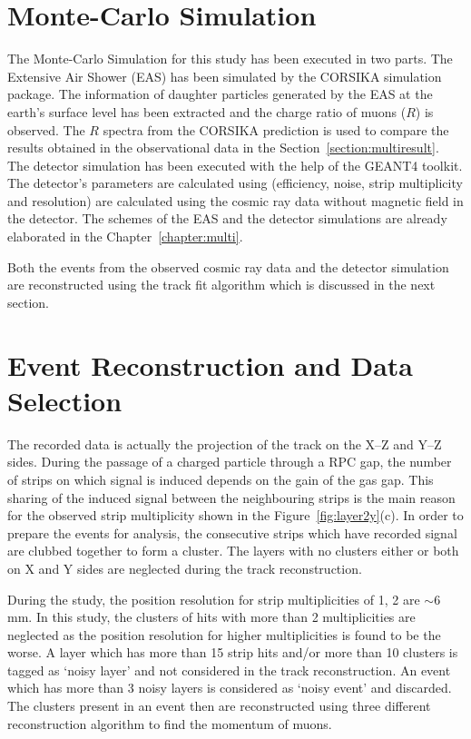 \section{Monte-Carlo Simulation}
The Monte-Carlo Simulation for this study has been executed in
two parts. The Extensive Air Shower (EAS) has been simulated
by the CORSIKA simulation package\cite{corsika763}. The information
of daughter particles generated by the EAS at the earth's surface
level has been extracted and the charge ratio of muons ($R$) is
observed. The $R$ spectra from the CORSIKA prediction is used to
compare the results obtained in the observational data in the
Section~\ref{section:multiresult}.
The detector simulation has been executed with the help
of the GEANT4 toolkit\cite{geant4}. The detector's parameters are
calculated using (efficiency, noise, strip multiplicity and
resolution) are calculated using the cosmic ray data without magnetic
field in the detector. The schemes of the EAS and the
detector simulations are already elaborated in the
Chapter~\ref{chapter:multi}.

Both the events from the observed cosmic ray data and the detector
simulation are reconstructed using the track fit algorithm which is
discussed in the next section.

\section{Event Reconstruction and Data Selection} \label{sec:momreco}
The recorded data is actually the projection of the track on the
\mbox{X--Z} and \mbox{Y--Z} sides. During the passage of a charged
particle through a RPC gap, the number of strips on which signal is
induced depends on the gain of the gas gap. This sharing of the induced
signal between the neighbouring strips is the main reason for the
observed strip multiplicity shown in the Figure~\ref{fig:layer2y}(c).
In order to prepare the events for analysis, the consecutive strips
which have recorded signal are clubbed together to form a cluster.
The layers with no clusters either or both on X and Y sides are
neglected during the track reconstruction.

During the study, the position resolution for strip multiplicities of
1, 2 are $\sim$6\,mm. In this study, the clusters of hits with more
than 2 multiplicities are neglected as the position resolution for
higher multiplicities is found to be the worse. A layer which has
more than 15 strip hits and/or more than 10 clusters is tagged as
`noisy layer' and not considered in the track reconstruction. An
event which has more than 3 noisy layers is considered as
`noisy event' and discarded. The clusters present in an event then
are reconstructed using three different reconstruction algorithm to
find the momentum of muons.

